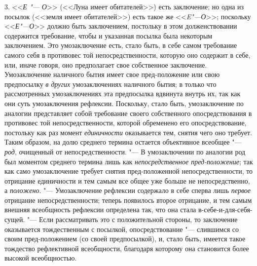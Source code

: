 3. <<{\em Е "--- О}>>
(<<Луна имеет обитателей>>) есть заключение; но одна из посылок
(<<земля имеет обитателей>>) есть такое же <<{\em E"---О}>>;
поскольку <<{\em Е"---О}>>
должно быть заключением, постольку в этом долженствовании
содержится требование, чтобы и указанная посылка была некоторым
заключением. Это умозаключение есть, стало быть, в себе самом требование
самого себя в противовес той непосредственности, которую оно содержит в
себе, или, иначе говоря, оно предполагает свое собственное заключение.
Умозаключение наличного бытия имеет свое пред-положение или свою
предпосылку {\em в других}
умозаключениях наличного бытия; в только что
рассмотренных умозаключениях эта предпосылка вдвинута внутрь
их, так как они суть умозаключения рефлексии. Поскольку, стало быть,
умозаключение по аналогии представляет собой требование своего собственного
опосредствования в противовес той непосредственности, которой обременено
его опосредствование, постольку как раз момент
{\em единичности}
оказывается тем, снятия чего оно требует. Таким образом, на
долю среднего термина остается объективное всеобщее
"--- {\em род}, очищенный от
непосредственности. "--- В умозаключении по аналогии род был
моментом среднего термина лишь как
{\em непосредственное пред-положение};
так как само умозаключение требует снятия пред-положенной
непосредственности, то отрицание единичности и тем самым все общее уже
больше не непосредственно, а
{\em положено}. "---
Умозаключение рефлексии содержало в себе сперва лишь
{\em первое} отрицание
непосредственности; теперь появилось второе отрицание, и тем самым внешняя
всеобщность рефлексии определена так, что она стала
в-себе-и-для-себя-сущей. "--- Если рассматривать это с
положительной стороны, то заключение оказывается тождественным с посылкой,
опосредствование "--- слившимся со своим пред-положением (со
своей предпосылкой), и, стало быть, имеется такое тождество рефлективной
всеобщности, благодаря которому она становится более высокой
всеобщностью.

